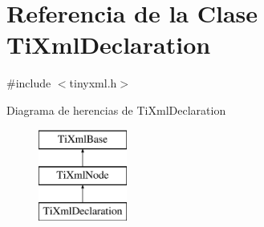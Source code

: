 \hypertarget{class_ti_xml_declaration}{\section{Referencia de la Clase Ti\-Xml\-Declaration}
\label{class_ti_xml_declaration}
}


{\ttfamily \#include $<$tinyxml.\-h$>$}

Diagrama de herencias de Ti\-Xml\-Declaration\begin{figure}[H]
\begin{center}
\leavevmode
\includegraphics[height=3.000000cm]{class_ti_xml_declaration}
\end{center}
\end{figure}
